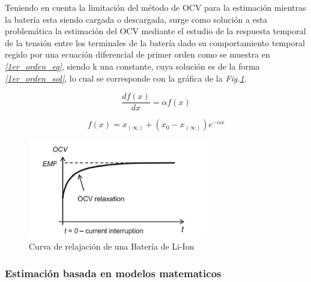 \documentclass[10pt,a4paper]{article}
\begin{document}
	Teniendo en cuenta la limitación del método de OCV para la estimación 
    mientras la batería esta siendo cargada o descargada, surge como solución 
    a esta problemática la estimación del OCV mediante el estudio de la 
    respuesta temporal de la tensión entre los terminales de la batería dado 
    su comportamiento temporal regido por una ecuación diferencial de primer 
    orden como se muestra en \emph{\ref{1er_orden_eq}}, siendo k una constante, 
    cuya solución es de la forma \emph{\ref{1er_orden_sol}}, lo cual se 
    corresponde con la gráfica de la \emph{Fig.\ref{EMF_Method}}.
	
	\begin{figure}[h!]
		\begin{center}
			\begin{equation}
				\frac{df(x)}{dx} = \alpha f(x)
				\label{1er_orden_eq}
			\end{equation}	
		\end{center}
	\end{figure}
	
	\begin{figure}[h!]
		\begin{center}
			\begin{equation}
				f(x)= x_{(\infty)}+(x_0-x_{(\infty)})e^{-\alpha x}
				\label{1er_orden_sol}
			\end{equation}	
		\end{center}
	\end{figure}
	
	\begin{figure}[h!]
		\begin{center}
			\includegraphics[width=0.7\textwidth]{EMF_Relaxation.png}
			\caption{Curva de relajación de una Batería de Li-Ion}
			\label{EMF_Method}
		\end{center}
	\end{figure}
	
	
	\clearpage
	
	\subsubsection{Estimación basada en modelos matematicos}
\end{document}

